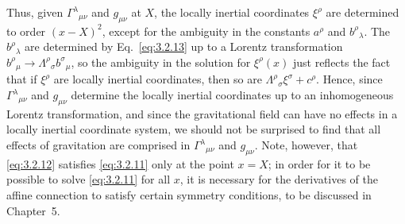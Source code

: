 Thus, given $\Gamma^\lambda{}_{\mu\nu}$ and $g_{\mu\nu}$ at $X$, the locally
inertial coordinates $\xi^\rho$ are determined to order $(x-X)^2$, except
for the ambiguity in the constants $a^\rho$ and $b^\rho{}_\lambda$. The
$b^\rho{}_\lambda$ are determined by Eq.~\eqref{eq:3.2.13} up to a Lorentz
transformation
$b^\rho{}_\mu\to\Lambda^\rho{}_\sigma b^\sigma{}_\mu$, so the ambiguity in
the solution for $\xi^\rho(x)$ just reflects the fact that if $\xi^\rho$ are
locally inertial coordinates, then so are
$\Lambda^\rho{}_\sigma\xi^\sigma+c^\rho$. Hence, since
$\Gamma^\lambda{}_{\mu\nu}$ and $g_{\mu\nu}$ determine the locally inertial
coordinates up to an inhomogeneous Lorentz transformation, and since the
gravitational field can have no effects in a locally inertial coordinate
system, we should not be surprised to find that all effects of gravitation
are comprised in $\Gamma^\lambda{}_{\mu\nu}$ and $g_{\mu\nu}$. Note,
however, that \eqref{eq:3.2.12} satisfies \eqref{eq:3.2.11} only at the point
$x=X$; in order for it to be possible to solve \eqref{eq:3.2.11} for all
$x$, it is necessary for the derivatives of the affine connection to
satisfy certain symmetry conditions, to be discussed in Chapter~5.
